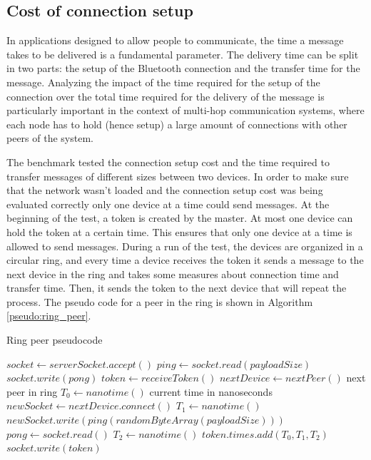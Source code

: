 \subsection{Cost of connection setup}
In applications designed to allow people to communicate, the time a message takes to be delivered is a fundamental parameter.
The delivery time can be split in two parts: the setup of the Bluetooth connection and the transfer time for the message.
Analyzing the impact of the time required for the setup of the connection over the total time required for the delivery of the message is particularly important in the context of multi-hop communication systems, where each node has to hold (hence setup) a large amount of connections with other peers of the system.

The benchmark tested the connection setup cost and the time required to transfer messages of different sizes between two devices.
In order to make sure that the network wasn't loaded and the connection setup cost was being evaluated correctly only one device at a time could send messages.
At the beginning of the test, a token is created by the master. At most one device can hold the token at a certain time. This ensures that only one device at a time is allowed to send messages.
During a run of the test, the devices are organized in a circular ring, and every time a device receives the token it sends a message to the next device in the ring and takes some measures about connection time and transfer time. Then, it sends the token to the next device that will repeat the process.
The pseudo code for a peer in the ring is shown in Algorithm \ref{pseudo:ring_peer}.

\begin{algorithm}
	\begin{algorithmic}[1]
  		\caption{Ring peer pseudocode}
  		\label{pseudo:ring_peer}
		\State $socket \leftarrow serverSocket.accept()$
		\State $ping \leftarrow socket.read(payloadSize)$
		\State $socket.write(pong)$
		\State $token \leftarrow receiveToken()$
		\State $nextDevice \leftarrow nextPeer()$ \Comment next peer in ring
		\State $T_0 \leftarrow nanotime()$ \Comment current time in nanoseconds
		\State $newSocket \leftarrow nextDevice.connect()$
		\State $T_1 \leftarrow nanotime()$ 
		\State $newSocket.write(ping(randomByteArray(payloadSize)))$
		\State $pong \leftarrow socket.read()$
		\State $T_2 \leftarrow nanotime()$
		\State $token.times.add(T_0, T_1, T_2)$
		\State $socket.write(token)$
		\EndWhile
  	\end{algorithmic}
\end{algorithm}

